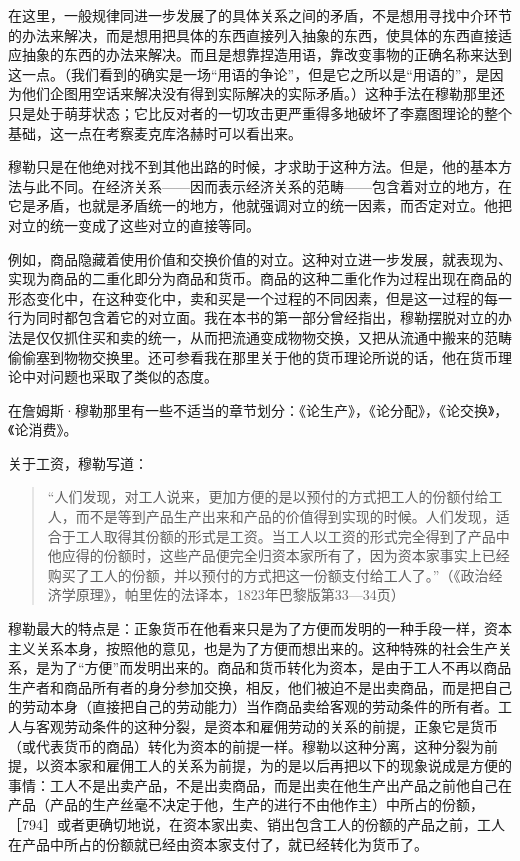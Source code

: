 在这里，一般规律同进一步发展了的具体关系之间的矛盾，不是想用寻找中介环节的办法来解决，而是想用把具体的东西直接列入抽象的东西，使具体的东西直接适应抽象的东西的办法来解决。而且是想靠捏造用语，靠改变事物的正确名称来达到这一点。（我们看到的确实是一场“用语的争论”，但是它之所以是“用语的”，是因为他们企图用空话来解决没有得到实际解决的实际矛盾。）这种手法在穆勒那里还只是处于萌芽状态；它比反对者的一切攻击更严重得多地破坏了李嘉图理论的整个基础，这一点在考察麦克库洛赫时可以看出来。

穆勒只是在他绝对找不到其他出路的时候，才求助于这种方法。但是，他的基本方法与此不同。在经济关系——因而表示经济关系的范畴——包含着对立的地方，在它是矛盾，也就是矛盾统一的地方，他就强调对立的统一因素，而否定对立。他把对立的统一变成了这些对立的直接等同。

例如，商品隐藏着使用价值和交换价值的对立。这种对立进一步发展，就表现为、实现为商品的二重化即分为商品和货币。商品的这种二重化作为过程出现在商品的形态变化中，在这种变化中，卖和买是一个过程的不同因素，但是这一过程的每一行为同时都包含着它的对立面。我在本书的第一部分曾经指出，穆勒摆脱对立的办法是仅仅抓住买和卖的统一，从而把流通变成物物交换，又把从流通中搬来的范畴偷偷塞到物物交换里。还可参看我在那里关于他的货币理论所说的话，他在货币理论中对问题也采取了类似的态度。

在詹姆斯·穆勒那里有一些不适当的章节划分：《论生产》，《论分配》，《论交换》，《论消费》。


关于工资，穆勒写道：

\begin{quote}{“人们发现，对工人说来，更加方便的是以预付的方式把工人的份额付给工人，而不是等到产品生产出来和产品的价值得到实现的时候。人们发现，适合于工人取得其份额的形式是工资。当工人以工资的形式完全得到了产品中他应得的份额时，这些产品便完全归资本家所有了，因为资本家事实上已经购买了工人的份额，并以预付的方式把这一份额支付给工人了。”（《政治经济学原理》，帕里佐的法译本，1823年巴黎版第33—34页）}\end{quote}

穆勒最大的特点是：正象货币在他看来只是为了方便而发明的一种手段一样，资本主义关系本身，按照他的意见，也是为了方便而想出来的。这种特殊的社会生产关系，是为了“方便”而发明出来的。商品和货币转化为资本，是由于工人不再以商品生产者和商品所有者的身分参加交换，相反，他们被迫不是出卖商品，而是把自己的劳动本身（直接把自己的劳动能力）当作商品卖给客观的劳动条件的所有者。工人与客观劳动条件的这种分裂，是资本和雇佣劳动的关系的前提，正象它是货币（或代表货币的商品）转化为资本的前提一样。穆勒以这种分离，这种分裂为前提，以资本家和雇佣工人的关系为前提，为的是以后再把以下的现象说成是方便的事情：工人不是出卖产品，不是出卖商品，而是出卖在他生产出产品之前他自己在产品（产品的生产丝毫不决定于他，生产的进行不由他作主）中所占的份额，［794］或者更确切地说，在资本家出卖、销出包含工人的份额的产品之前，工人在产品中所占的份额就已经由资本家支付了，就已经转化为货币了。

